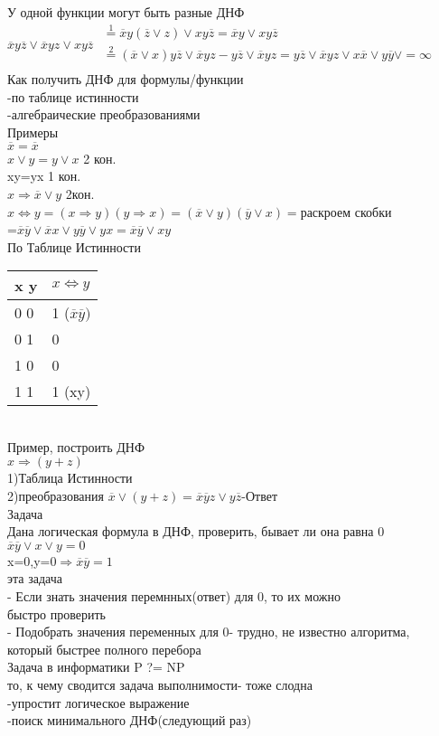 \documentclass{article}
\begin{document}
У одной функции могут быть разные ДНФ\\
$\overline{x}y\overline{z}\vee\overline{x}yz\vee xy\overline{z}$
$
\left.
\begin{array}{lcl}
\overset{1}{=}\overline{x}y(\overline{z}\vee z)\vee xy\overline{z}=\overline{x}y\vee xy\overline{z}\\
\overset{2}{=}(\overline{x}\vee x)y\overline{z}\vee \overline{x}yz-y\overline{z}\vee \overline{x}yz=y\overline{z}\vee \overline{x}yz\vee x\overline{x}\vee y\overline{y}\vee=\infty\\
\end{array}
\right.
$\\
Как получить ДНФ для формулы/функции\\
-по таблице истинности\\
-алгебраические преобразованиями\\
Примеры\\
$\overline{x}=\overline{x}$\\
$x\vee y=y\vee x$ 2 кон.\\
xy=yx 1 кон.\\
$x\Rightarrow \overline{x}\vee y$ 2кон.\\
$x\Leftrightarrow y=(x\Rightarrow y)(y\Rightarrow x)=(\overline{x}\vee y)(\overline{y}\vee x)=$раскроем скобки\\
=$\overline{x}\overline{y}\vee \overline{x}x\vee y\overline{y}\vee yx=\overline{x}\overline{y}\vee xy$\\
По Таблице Истинности\\
\begin{tabular}{l|l}
x y& $x\Leftrightarrow y$\\
\hline
0 0&1 ($\overline{x}\overline{y})$\\
0 1&0\\
1 0&0\\
1 1&1 (xy)
\end{tabular}\\
Пример, построить ДНФ\\
$x\Rightarrow(y+z)$\\
1)Таблица Истинности\\
2)преобразования $\overline{x}\vee(y+z)=\overline{x}\overline{y}z\vee y\overline{z}$-Ответ\\
Задача\\
Дана логическая формула в ДНФ, проверить, бывает ли она равна 0\\
$\overline{x}\overline{y}\vee x\vee y =0$\\
x=0,y=0$\Rightarrow \overline{x}\overline{y}=1$\\
эта задача\\
- Если знать значения перемнных(ответ) для 0, то их можно\\
быстро проверить\\
- Подобрать значения переменных для 0- трудно, не известно алгоритма,\\
который быстрее полного перебора\\
Задача в информатики P ?= NP\\
то, к чему сводится задача выполнимости- тоже слодна\\
-упростит логическое выражение\\
-поиск минимального ДНФ(следующий раз)
\end{document}
